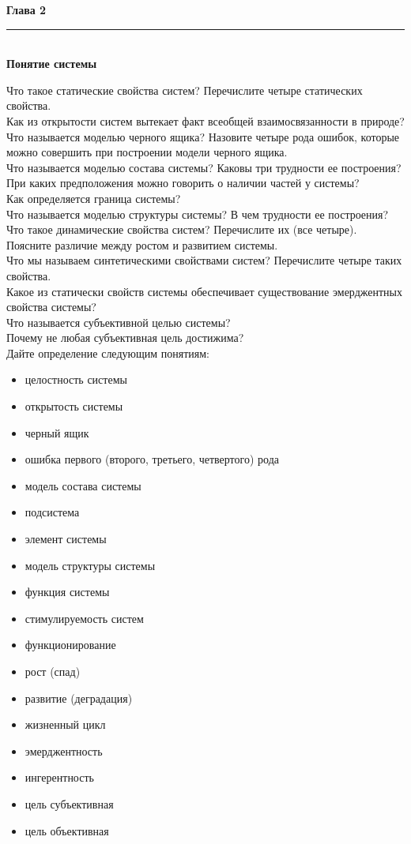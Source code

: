 \documentclass{article}
\renewcommand{\section}[2]{
	\vspace{5em}
	\begin{flushright}
	\Large
	\baselineskip=0.5\baselineskip
	\textbf{#1}
	\\
	\rule[0.5\baselineskip]{\textwidth}{0.15pt}
	\\
	\textbf{#2}
	\end{flushright}
	}
\begin{document}
\section{Глава 2}{Понятие системы}
Что такое статические свойства систем? Перечислите четыре статических свойства.
\\
Как из открытости систем вытекает факт всеобщей взаимосвязанности в природе?
\\
Что называется моделью черного ящика? Назовите четыре рода ошибок, которые можно совершить при построении модели черного ящика.
\\
Что называется моделью состава системы? Каковы три трудности ее построения?
\\
При каких предположения можно говорить о наличии частей у системы?
\\
Как определяется граница системы?
\\
Что называется моделью структуры системы? В чем трудности ее построения?
\\
Что такое динамические свойства систем? Перечислите их (все четыре).
\\
Поясните различие между ростом и развитием системы.
\\
Что мы называем синтетическими свойствами систем? Перечислите четыре таких свойства.
\\
Какое из статически свойств системы обеспечивает существование эмерджентных свойства системы?
\\
Что называется субъективной целью системы?
\\
Почему не любая субъективная цель достижима?
\\
Дайте определение следующим понятиям:
\begin{itemize}
	\item целостность системы
	\item открытость системы
	\item черный ящик
	\item ошибка первого (второго, третьего, четвертого) рода
	\item модель состава системы
	\item подсистема
	\item элемент системы
	\item модель структуры системы
	\item функция системы
	\item стимулируемость систем
	\item функционирование
	\item рост (спад)
	\item развитие (деградация)
	\item жизненный цикл
	\item эмерджентность
	\item ингерентность
	\item цель субъективная
	\item цель объективная
\end{itemize}
\end{document}
